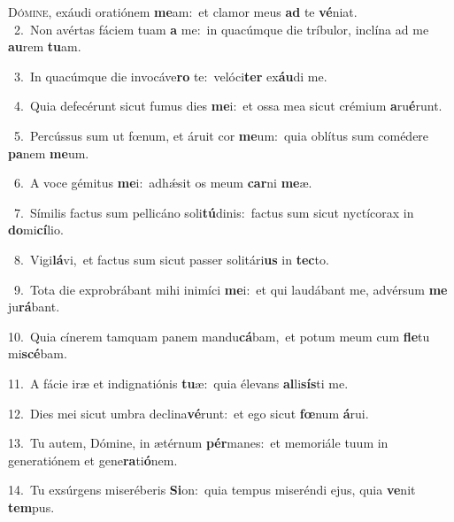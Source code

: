 \lettrine{\initial\textcolor{\initialcolor}{D}}{ómine,} exáudi oratiónem \textbf{me}\-am:~\star et clamor meus \textbf{ad} te \textbf{vé}\-niat.\\
{\numbfont\textcolor{\numbcolor}{~2.}}~Non avértas fáciem tuam \textbf{a} me:~\star in quacúmque die tríbulor, inclína ad me \textbf{au}\-rem \textbf{tu}\-am.\par
{\numbfont\textcolor{\numbcolor}{~3.}}~In quacúmque die invocáve\textbf{ro} te:~\star velóci\textbf{ter} ex\-\textbf{áu}\-di me.\par
{\numbfont\textcolor{\numbcolor}{~4.}}~Quia defecérunt sicut fumus dies \textbf{me}\-i:~\star et ossa mea sicut crémium \textbf{a}\-ru\-\textbf{é}\-runt.\par
{\numbfont\textcolor{\numbcolor}{~5.}}~Percússus sum ut fœnum, et áruit cor \textbf{me}\-um:~\star quia oblítus sum comédere \textbf{pa}\-nem \textbf{me}\-um.\par
{\numbfont\textcolor{\numbcolor}{~6.}}~A voce gémitus \textbf{me}\-i:~\star adhǽsit os meum \textbf{car}\-ni \textbf{me}\-æ.\par
{\numbfont\textcolor{\numbcolor}{~7.}}~Símilis factus sum pellicáno soli\-\textbf{tú}\-dinis:~\star factus sum sicut nyctícorax in \textbf{do}\-mi\-\textbf{cí}\-lio.\par
{\numbfont\textcolor{\numbcolor}{~8.}}~Vigi\-\textbf{lá}\-vi,~\star et factus sum sicut passer solitári\textbf{us} in \textbf{tec}\-to.\par
{\numbfont\textcolor{\numbcolor}{~9.}}~Tota die exprobrábant mihi inimíci \textbf{me}\-i:~\star et qui laudábant me, advérsum \textbf{me} ju\-\textbf{rá}\-bant.\par
{\numbfont\textcolor{\numbcolor}{10.}}~Quia cínerem tamquam panem mandu\-\textbf{cá}\-bam,~\star et potum meum cum \textbf{fle}\-tu mi\-\textbf{scé}\-bam.\par
{\numbfont\textcolor{\numbcolor}{11.}}~A fácie iræ et indignatiónis \textbf{tu}\-æ:~\star quia élevans \textbf{al}\-li\-\textbf{sís}\-ti me.\par
{\numbfont\textcolor{\numbcolor}{12.}}~Dies mei sicut umbra declina\-\textbf{vé}\-runt:~\star et ego sicut \textbf{fœ}\-num \textbf{á}\-rui.\par
{\numbfont\textcolor{\numbcolor}{13.}}~Tu autem, Dómine, in ætérnum \textbf{pér}\-manes:~\star et memoriále tuum in generatiónem et gene\-\textbf{ra}\-ti\-\textbf{ó}\-nem.\par
{\numbfont\textcolor{\numbcolor}{14.}}~Tu exsúrgens miseréberis \textbf{Si}\-on:~\star quia tempus miseréndi ejus, quia \textbf{ve}\-nit \textbf{tem}\-pus.\par
